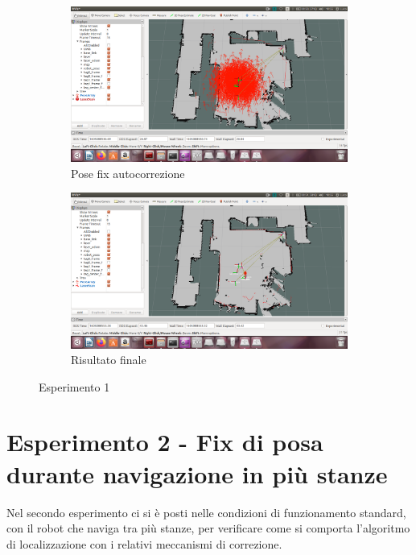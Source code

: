 \begin{figure}[ht]\ContinuedFloat
\begin{subfigure}{.5\textwidth}
  \centering
  \includegraphics[width=1\linewidth]{Capitolo3/Figs/esperimento2_3_pose_fix_automatico_di_correzione.png}  
  \caption{Pose fix autocorrezione}
	\label{subfig:esp1_3}
\end{subfigure}
\begin{subfigure}{.5\textwidth}
  \centering
  \includegraphics[width=1\linewidth]{Capitolo3/Figs/esperimento2_4_risultato_finale.png}  
  \caption{Risultato finale}
  	\label{subfig:esp1_4}
\end{subfigure}
\caption{Esperimento 1}
\end{figure}

\bigskip
\bigskip
\bigskip
\bigskip

\section{Esperimento 2 - Fix di posa durante navigazione in più stanze}
Nel secondo esperimento ci si è posti nelle condizioni di funzionamento standard, con il robot che naviga tra più stanze, per verificare come si comporta l'algoritmo di localizzazione con i relativi meccanismi di correzione.


